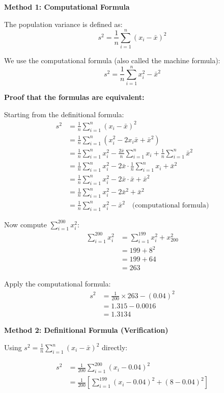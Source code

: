 \documentclass[12pt]{article}
\begin{document}
\begin{solution}
\textbf{Method 1: Computational Formula}

The population variance is defined as:
\[
s^2 = \frac{1}{n}\sum_{i=1}^{n}(x_i - \bar{x})^2
\]

We use the computational formula (also called the machine formula):
\[
s^2 = \frac{1}{n}\sum_{i=1}^{n} x_i^2 - \bar{x}^2
\]

\textbf{Proof that the formulas are equivalent:}

Starting from the definitional formula:
\begin{align*}
s^2 &= \frac{1}{n}\sum_{i=1}^{n}(x_i - \bar{x})^2 \\
&= \frac{1}{n}\sum_{i=1}^{n}(x_i^2 - 2x_i\bar{x} + \bar{x}^2) \\
&= \frac{1}{n}\sum_{i=1}^{n}x_i^2 - \frac{2\bar{x}}{n}\sum_{i=1}^{n}x_i + \frac{1}{n}\sum_{i=1}^{n}\bar{x}^2 \\
&= \frac{1}{n}\sum_{i=1}^{n}x_i^2 - 2\bar{x} \cdot \frac{1}{n}\sum_{i=1}^{n}x_i + \bar{x}^2 \\
&= \frac{1}{n}\sum_{i=1}^{n}x_i^2 - 2\bar{x} \cdot \bar{x} + \bar{x}^2 \\
&= \frac{1}{n}\sum_{i=1}^{n}x_i^2 - 2\bar{x}^2 + \bar{x}^2 \\
&= \frac{1}{n}\sum_{i=1}^{n}x_i^2 - \bar{x}^2 \quad \text{(computational formula)}
\end{align*}

Now compute \(\sum_{i=1}^{200} x_i^2\):
\begin{align*}
\sum_{i=1}^{200} x_i^2 &= \sum_{i=1}^{199} x_i^2 + x_{200}^2 \\
&= 199 + 8^2 \\
&= 199 + 64 \\
&= 263
\end{align*}

Apply the computational formula:
\begin{align*}
s^2 &= \frac{1}{200} \times 263 - (0.04)^2 \\
&= 1.315 - 0.0016 \\
&= 1.3134
\end{align*}

\textbf{Method 2: Definitional Formula (Verification)}

Using \(s^2 = \frac{1}{n}\sum_{i=1}^{n}(x_i - \bar{x})^2\) directly:

\begin{align*}
s^2 &= \frac{1}{200}\sum_{i=1}^{200}(x_i - 0.04)^2 \\
&= \frac{1}{200}\left[\sum_{i=1}^{199}(x_i - 0.04)^2 + (8 - 0.04)^2\right]
\end{align*}


\end{solution}
\end{document}
